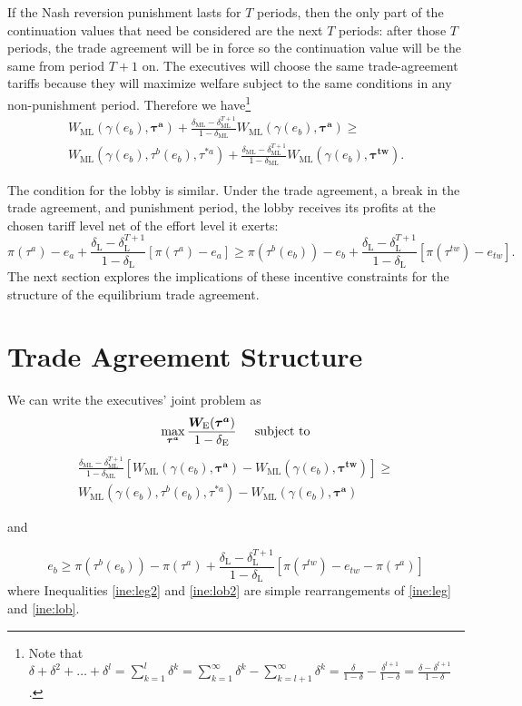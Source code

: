 \documentclass[authoryear, review]{elsarticle}
\newcommand{\bta}{\bm{\tau^a}}
\newcommand{\ga}{\gamma}
\newcommand{\btw}{\bm{\tau^{tw}}}
\newcommand{\de}{\delta}
\begin{document}
If the Nash reversion punishment lasts for $T$ periods, then the only part of the continuation values that need be considered are the next $T$ periods: after those $T$ periods, the trade agreement will be in force so the continuation value will be the same from period $T+1$ on. The executives will choose the same trade-agreement tariffs because they will maximize welfare subject to the same conditions in any non-punishment period. Therefore we have\footnote{Note that $\de + \de^2 + \ldots + \de^l = \sum_{k=1}^l \de^k= \sum_{k=1}^\infty \de^k - \sum_{k=l+1}^\infty \de^k = \frac{\de}{1-\de} - \frac{\de^{l+1}}{1-\de} = \frac{\de - \de^{l+1}}{1-\de} $.}
\begin{multline}
  W_\text{ML}(\ga(e_b),\bta) + \frac{\de_\text{ML} - \de_\text{ML}^{T+1}}{1-\de_\text{ML}} W_\text{ML}(\ga(e_b),\bta) \geq \\
	W_\text{ML}(\ga(e_b),\tau^b(e_b),\tau^{*a}) + \frac{\de_\text{ML} - \de_\text{ML}^{T+1}}{1-\de_\text{ML}} W_\text{ML}(\ga(e_b),\btw).
  \label{ine:leg}
\end{multline}

The condition for the lobby is similar. Under the trade agreement, a break in the trade agreement, and punishment period, the lobby receives its profits at the chosen tariff level net of the effort level it exerts:
\begin{equation}
  \pi(\tau^a) - e_a + \frac{\de_\text{L} - \de_\text{L}^{T+1}}{1-\de_\text{L}} \left[\pi(\tau^a) - e_a \right] \geq \pi(\tau^b(e_b)) - e_b + \frac{\de_\text{L} - \de_\text{L}^{T+1}}{1-\de_\text{L}} \left[\pi(\tau^{tw}) - e_{tw} \right] .
  \label{ine:lob}
\end{equation}
The next section explores the implications of these incentive constraints for the structure of the equilibrium trade agreement.

\section{Trade Agreement Structure}
\label{sec:structure}
We can write the executives' joint problem as
\begin{equation}
  \max_{\bta} \frac{\bm{W_\text{E}}(\bta)}{1-\de_\text{E}} \hskip.2in \text{subject to}
  \label{prob:max}
\end{equation}
\begin{multline}
  \frac{\de_\text{ML} - \de_\text{ML}^{T+1}}{1-\de_\text{ML}} \left[W_\text{ML}(\ga(e_b),\bta) - W_{\text{ML}}(\ga(e_b),\btw) \right] \geq \\
	W_{\text{ML}}(\ga(e_b),\tau^b(e_b),\tau^{*a}) - W_{\text{ML}}(\ga(e_b),\bta)
  \label{ine:leg2}
\end{multline}
\begin{center}
and
\end{center}
\begin{equation}
  e_b \geq \pi(\tau^b(e_b)) - \pi(\tau^a) + \frac{\de_\text{L} - \de_\text{L}^{T+1}}{1-\de_\text{L}} \left[\pi(\tau^{tw}) -e_{tw} - \pi(\tau^a) \right]
  \label{ine:lob2}
\end{equation}
where Inequalities \ref{ine:leg2} and \ref{ine:lob2} are simple rearrangements of \ref{ine:leg} and \ref{ine:lob}.
\end{document}
